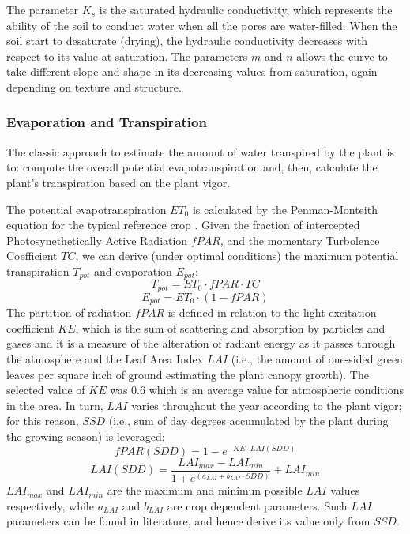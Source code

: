 The parameter $K_s$ is the saturated hydraulic conductivity, which represents the ability of the soil to conduct water when all the pores are water-filled. When the soil start to desaturate (drying), the hydraulic conductivity decreases with respect to its value at saturation.
The parameters $m$ and $n$ allows the curve to take different slope and shape in its decreasing values from saturation, again depending on texture and structure. 

\subsubsection{Evaporation and Transpiration}
\label{orchard-sec:evapotrans}
The classic approach to estimate the amount of water transpired by the plant is to: compute the overall potential evapotranspiration and, then, calculate the plant's transpiration based on the plant vigor.

The potential evapotranspiration $ET_0$ is calculated by the Penman-Monteith equation for the typical reference crop \cite{allen-etal-1988}.
Given the fraction of intercepted Photosynethetically Active Radiation $fPAR$, and the momentary Turbolence Coefficient $TC$, we can derive (under optimal conditions) the maximum potential transpiration $T_{pot}$ and evaporation $E_{pot}$:
%
\begin{equation}
\label{maxET}
T_{pot} = ET_0 \cdot fPAR \cdot TC
\end{equation}
\begin{equation}
\label{minET}
E_{pot}= ET_0 \cdot (1-fPAR)
\end{equation}
%
The partition of radiation $fPAR$ is defined in relation to the light excitation coefficient $KE$, which is the sum of scattering and absorption by particles and gases and it is a measure of the alteration of radiant energy as it passes through the atmosphere and the Leaf Area Index $LAI$ (i.e., the amount of one-sided green leaves per square inch of ground estimating the plant canopy growth).
The selected value of $KE$ was 0.6 which is an average value for atmospheric conditions in the area.
In turn, $LAI$ varies throughout the year according to the plant vigor; for this reason, $SSD$ (i.e., sum of day degrees accumulated by the plant during the growing season) is leveraged:
%
\begin{equation}
\label{fPARi}
fPAR(SDD) = 1- e^ {-KE \cdot LAI(SDD)}
\end{equation}
\begin{equation}
\label{LAI}
LAI(SDD) = \frac{LAI_{max}-LAI_{min}}{1+e^{(a_{LAI}+b_{LAI}\cdot SDD)}}+ LAI_{min}
\end{equation}
$LAI_{max}$ and $LAI_{min}$ are the maximum and minimun possible $LAI$ values respectively, while $a_{LAI}$ and $b_{LAI}$ are crop dependent parameters. Such $LAI$ parameters can be found in literature, and hence derive its value only from $SSD$.

